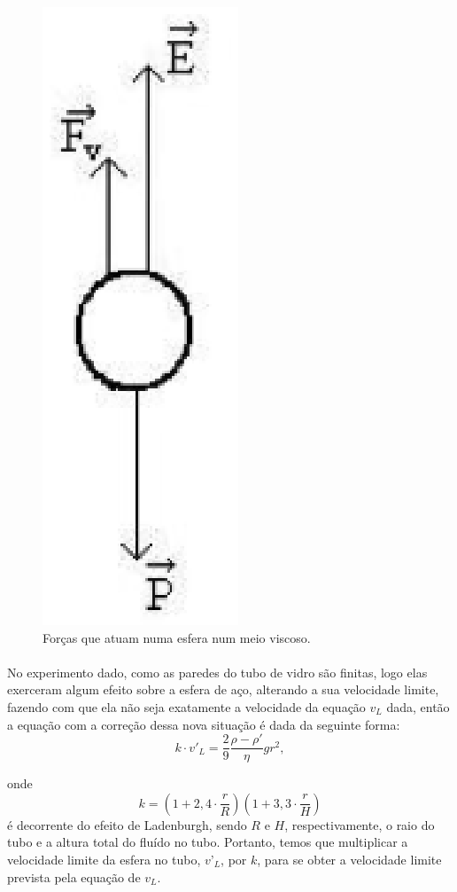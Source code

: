 \documentclass[a4paper, 11pt]{article}
\begin{document}
\begin{enumerate}
		\begin{figure}[h]
		\centering
		\includegraphics[scale = 0.5]{fig1.eps}
		\caption{Forças que atuam numa esfera num meio viscoso.}
		\end{figure}

\paragraph{}
No experimento dado, como as paredes do tubo de vidro são finitas, logo elas exerceram algum efeito sobre a esfera de aço, alterando a sua velocidade limite, fazendo com que ela não seja exatamente a velocidade da equação $v_L$ dada, então a equação com a correção dessa nova situação é dada da seguinte forma:
$$k \cdot v'_L = \dfrac{2}{9} \dfrac{\rho - \rho'}{\eta} g r^2 ,$$

onde 
$$k = (1 + 2,4 \cdot \dfrac{r}{R})(1 + 3,3 \cdot \dfrac{r}{H})$$
é decorrente do efeito de Ladenburgh, sendo $R$ e $H$, respectivamente, o raio do tubo e a altura total do fluído no tubo. Portanto, temos que multiplicar a velocidade limite da esfera no tubo, $v’_L$, por $k$, para se obter a velocidade limite prevista pela equação de $v_L$.
\pagebreak


\end{enumerate}
\end{document}
